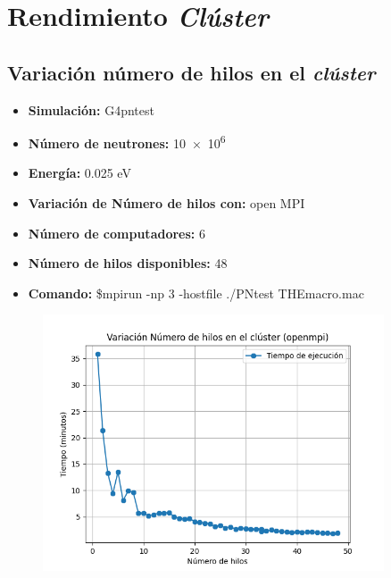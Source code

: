 \section{Rendimiento \emph{Clúster}}

\subsection{Variación número de hilos en el \emph{clúster}}

\begin{itemize}
    \item \textbf{Simulación:} G4pntest
    \item \textbf{Número de neutrones:} \num{10e6}
    \item \textbf{Energía:} 0.025 eV
    \item \textbf{Variación de Número de hilos con:} open MPI
    \item \textbf{Número de computadores:} 6
    \item \textbf{Número de hilos disponibles:} 48
    \item \textbf{Comando:} \$mpirun -np 3 -hostfile ./PNtest THEmacro.mac    
\end{itemize}

\begin{figure}[htb]
	\centering
	\includegraphics[width=0.9\textwidth]{images/hilos_openmpi.png}
	\label{fig:AntennaDesign}
\end{figure}









